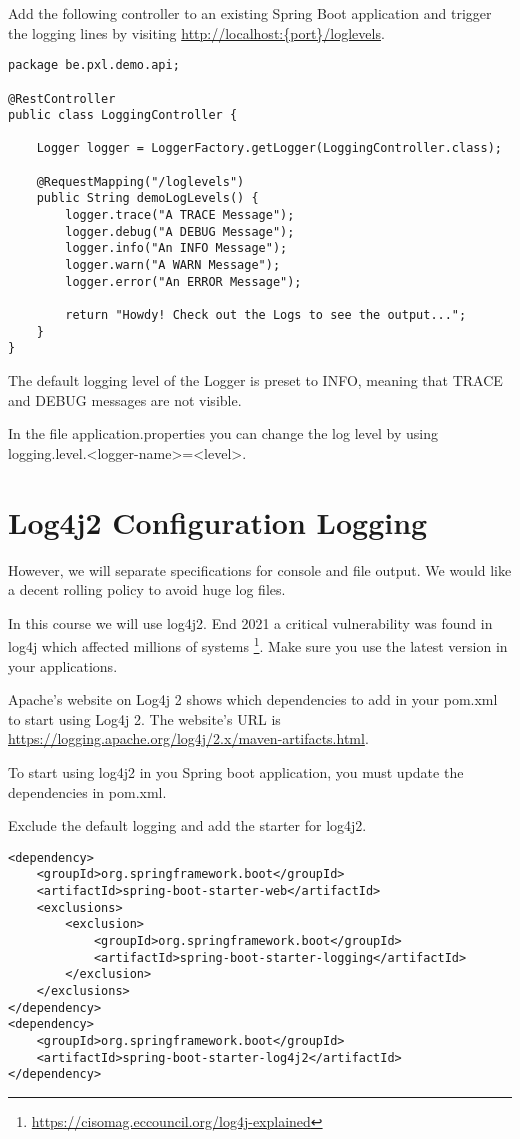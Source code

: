 Add the following controller to an existing Spring Boot application and trigger the logging lines by visiting \url{http://localhost:{port}/loglevels}.


\begin{lstlisting}
package be.pxl.demo.api;

@RestController
public class LoggingController {

    Logger logger = LoggerFactory.getLogger(LoggingController.class);

    @RequestMapping("/loglevels")
    public String demoLogLevels() {
        logger.trace("A TRACE Message");
        logger.debug("A DEBUG Message");
        logger.info("An INFO Message");
        logger.warn("A WARN Message");
        logger.error("An ERROR Message");

        return "Howdy! Check out the Logs to see the output...";
    }
}
\end{lstlisting}

The default logging level of the Logger is preset to INFO, meaning that TRACE and DEBUG messages are not visible.

In the file application.properties you can change the log level by using logging.level.<logger-name>=<level>.

\section{Log4j2 Configuration Logging}

However, we will separate specifications for console and file output. We would like a decent rolling policy to avoid huge log files.

In this course we will use log4j2.  End 2021 a critical vulnerability was found in log4j which affected millions of systems \footnote{\url{https://cisomag.eccouncil.org/log4j-explained}}.  Make sure you use the latest version in your applications.

Apache's website on Log4j 2 shows which dependencies to add in your pom.xml to start using Log4j 2.   The website's URL is \url{https://logging.apache.org/log4j/2.x/maven-artifacts.html}. 

To start using log4j2 in you Spring boot application, you must update the dependencies in pom.xml.

Exclude the default logging and add the starter for log4j2.\\

\begin{lstlisting}
<dependency>
    <groupId>org.springframework.boot</groupId>
    <artifactId>spring-boot-starter-web</artifactId>
    <exclusions>
        <exclusion>
            <groupId>org.springframework.boot</groupId>
            <artifactId>spring-boot-starter-logging</artifactId>
        </exclusion>
    </exclusions>
</dependency>
<dependency>
    <groupId>org.springframework.boot</groupId>
    <artifactId>spring-boot-starter-log4j2</artifactId>
</dependency>
\end{lstlisting}


